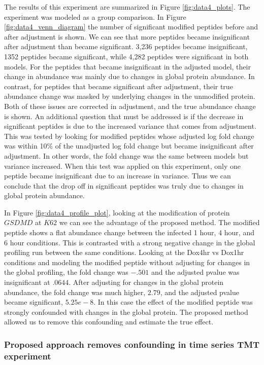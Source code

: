 \documentclass[mcp]{article}
\numberwithin{table}{section}
\begin{document}
The results of this experiment are summarized in Figure \ref{fig:data4_plots}. The experiment was modeled as a group comparison. In Figure \ref{fig:data4_venn_diagram} the number of significant modified peptides before and after adjustment is shown. We can see that more peptides became insignificant after adjustment than became significant. 3,236 peptides became insignificant, 1352 peptides became significant, while 4,282 peptides were significant in both models. For the peptides that became insignificant in the adjusted model, their change in abundance was mainly due to changes in global protein abundance. In contrast, for peptides that became significant after adjustment, their true abundance change was masked by underlying changes in the unmodified protein. Both of these issues are corrected in adjustment, and the true abundance change is shown. An additional question that must be addressed is if the decrease in significant peptides is due to the increased variance that comes from adjustment. This was tested by looking for modified peptides whose adjusted log fold change was within 10\% of the unadjusted log fold change but became insignificant after adjustment. In other words, the fold change was the same between models but variance increased. When this test was applied on this experiment, only one peptide became insignificant due to an increase in variance. Thus we can conclude that the drop off in significant peptides was truly due to changes in global protein abundance.

In Figure \ref{fig:data4_profile_plot}, looking at the modification of protein $GSDMD$ at $K62$ we can see the advantage of the proposed method. The modified peptide shows a flat abundance change between the infected 1 hour, 4 hour, and 6 hour conditions. This is contrasted with a strong negative change in the global profiling run between the same conditions. Looking at the Dox4hr vs Dox1hr conditions and modeling the modified peptide without adjusting for changes in the global profiling, the fold change was $-.501$ and the adjusted pvalue was insignificant at $.0644$. After adjusting for changes in the global protein abundance, the fold change was much higher, $2.79$, and the adjusted pvalue became significant, $5.25e-8$. In this case the effect of the modified peptide was strongly confounded with changes in the global protein. The proposed method allowed us to remove this confounding and estimate the true effect. 

\subsubsection*{Proposed approach removes confounding in time series TMT experiment}
\end{document}
